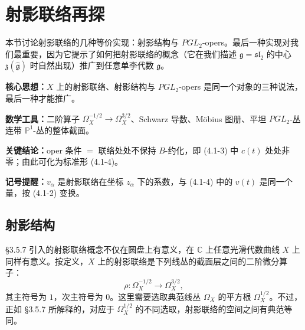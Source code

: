 \section{射影联络再探}

本节讨论射影联络的几种等价实现：射影结构与 $PGL_2$-opers。最后一种实现对我们最重要，因为它提示了如何把射影联络的概念（它在我们描述 $\mathfrak{g}=\mathfrak{sl}_2$ 的中心 $\mathfrak{z}(\hat{\mathfrak{g}})$ 时自然出现）推广到任意单李代数 $\mathfrak{g}$。

\begin{keypoints}
    \item \textbf{核心思想：}$X$ 上的射影联络、射影结构与 $PGL_2$-opers 是同一个对象的三种说法，最后一种才能推广。
    \item \textbf{数学工具：}二阶算子 $\Omega_X^{-1/2}\to\Omega_X^{3/2}$、Schwarz 导数、Möbius 图册、平坦 $PGL_2$-丛连带 $\mathbb{P}^1$-丛的整体截面。
    \item \textbf{关键结论：}oper 条件 $=$ 联络处处不保持 $B$-约化，即 (4.1-3) 中 $c(t)$ 处处非零；由此可化为标准形 (4.1-4)。
    \item \textbf{记号提醒：}$v_\alpha$ 是射影联络在坐标 $z_\alpha$ 下的系数，与 (4.1-4) 中的 $v(t)$ 是同一个量，按 (4.1-2) 变换。
\end{keypoints}

\subsection{射影结构}

§3.5.7 引入的射影联络概念不仅在圆盘上有意义，在 $\mathbb{C}$ 上任意光滑代数曲线 $X$ 上同样有意义。按定义，$X$ 上的射影联络是下列线丛的截面层之间的二阶微分算子：
\begin{equation}
    \rho:\Omega_X^{-1/2}\longrightarrow\Omega_X^{3/2},
    \tag{4.1-1}
\end{equation}
其主符号为 $1$，次主符号为 $0$。这里需要选取典范线丛 $\Omega_X$ 的平方根 $\Omega_X^{1/2}$。不过，正如 §3.5.7 所解释的，对应于 $\Omega_X^{1/2}$ 的不同选取，射影联络的空间之间有典范等同。

